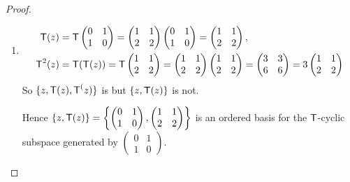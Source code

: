 \begin{proof}
\begin{enumerate}
\item
\begin{align*}
    \textsf{T}(z) & = \textsf{T} \begin{pmatrix} 0 & 1 \\ 1 & 0 \end{pmatrix} = \begin{pmatrix} 1 & 1 \\ 2 & 2 \end{pmatrix} \begin{pmatrix} 0 & 1 \\ 1 & 0 \end{pmatrix} = \begin{pmatrix} 1 & 1 \\ 2 & 2 \end{pmatrix}, \\
    \textsf{T}^2(z) & = \textsf{T}(\textsf{T}(z)) = \textsf{T} \begin{pmatrix} 1 & 1 \\ 2 & 2 \end{pmatrix} = \begin{pmatrix} 1 & 1 \\ 2 & 2 \end{pmatrix} \begin{pmatrix} 1 & 1 \\ 2 & 2 \end{pmatrix} = \begin{pmatrix} 3 & 3 \\ 6 & 6 \end{pmatrix} = 3 \begin{pmatrix} 1 & 1 \\ 2 & 2 \end{pmatrix}
\end{align*}
So \(\{ z, \textsf{T}(z), \textsf{T}^(z) \}\) is \LDP{} but \(\{ z, \textsf{T}(z) \}\) is not.

Hence \(\{ z, \textsf{T}(z) \} = \left\{ \begin{pmatrix} 0 & 1 \\ 1 & 0 \end{pmatrix}, \begin{pmatrix} 1 & 1 \\ 2 & 2 \end{pmatrix} \right\}\) is an ordered basis for the \(\textsf{T}\)-cyclic subspace generated by \(\begin{pmatrix} 0 & 1 \\ 1 & 0 \end{pmatrix}\).
\end{enumerate}
\end{proof}

